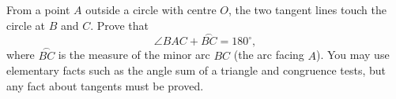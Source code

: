 From a point $A$ outside a circle with centre $O$, the two tangent lines touch the circle at $B$ and $C$. Prove that
\[\angle BAC+\overset{\frown}{BC}=180^\circ,\]
where $\overset{\frown}{BC}$ is the measure of the minor arc $BC$ (the arc facing $A$). You may use elementary facts such as the angle sum of a triangle and congruence tests, but any fact about tangents must be proved.
